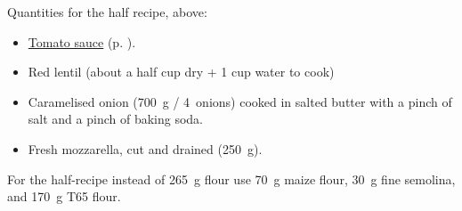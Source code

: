 
Quantities for the half recipe, above:
\begin{itemize}
\item \hyperref[tomato.sauce]{Tomato sauce} (p. \pageref{tomato.sauce}).
\item Red lentil (about a half cup dry + 1 cup water to cook)
\item Caramelised onion (700~g / 4~onions) cooked in salted butter
  with a pinch of salt and a pinch of baking soda.
\item Fresh mozzarella, cut and drained (250~g).
\end{itemize}


For the half-recipe instead of 265~g flour use 70~g maize flour, 30~g
fine semolina, and 170~g T65 flour.
